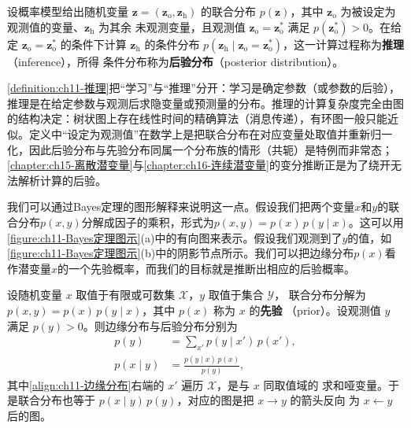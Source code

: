 \documentclass[../../main.tex]{subfiles}
\begin{document}
\begin{definition}[推理]\label{definition:ch11-推理}
设概率模型给出随机变量 $\mathbf{z}=(\mathbf{z}_{\mathrm{o}},
\mathbf{z}_{\mathrm{h}})$ 的联合分布 $p(\mathbf{z})$，其中
$\mathbf{z}_{\mathrm{o}}$ 为被设定为观测值的变量、$\mathbf{z}_{\mathrm{h}}$ 为其余
未观测变量，且观测值 $\mathbf{z}_{\mathrm{o}}=\mathbf{z}_{\mathrm{o}}^{\ast}$ 满足
$p(\mathbf{z}_{\mathrm{o}}^{\ast})>0$。在给定
$\mathbf{z}_{\mathrm{o}}=\mathbf{z}_{\mathrm{o}}^{\ast}$ 的条件下计算
$\mathbf{z}_{\mathrm{h}}$ 的条件分布
$p(\mathbf{z}_{\mathrm{h}}\mid \mathbf{z}_{\mathrm{o}}
=\mathbf{z}_{\mathrm{o}}^{\ast})$，这一计算过程称为\textbf{推理}（inference），所得
条件分布称为\textbf{后验分布}（posterior distribution）。
\end{definition}

\begin{remark}
\cref{definition:ch11-推理}把“学习”与“推理”分开：学习是确定参数（或参数的后验），推理是在给定参数与观测后求隐变量或预测量的分布。推理的计算复杂度完全由图的结构决定：树状图上存在线性时间的精确算法（消息传递），有环图一般只能近似。定义中“设定为观测值”在数学上是把联合分布在对应变量处取值并重新归一化，因此后验分布与先验分布同属一个分布族的情形（共轭）是特例而非常态；\cref{chapter:ch15-离散潜变量}与\cref{chapter:ch16-连续潜变量}的变分推断正是为了绕开无法解析计算的后验。
\end{remark}

我们可以通过Bayes定理的图形解释来说明这一点。假设我们把两个变量$x$和$y$的联合分布$p(x,y)$分解成因子的乘积，形式为$p(x,y)=p(x)\,p(y\mid x)$。这可以用\cref{figure:ch11-Bayes定理图示}(a)中的有向图来表示。假设我们观测到了$y$的值，如\cref{figure:ch11-Bayes定理图示}(b)中的阴影节点所示。我们可以把边缘分布$p(x)$看作潜变量$x$的一个先验概率，而我们的目标就是推断出相应的后验概率。

\begin{proposition}\label{proposition:ch11-Bayes更新}
设随机变量 $x$ 取值于有限或可数集 $\mathcal{X}$，$y$ 取值于集合 $\mathcal{Y}$，
联合分布分解为 $p(x,y)=p(x)\,p(y\mid x)$，其中 $p(x)$ 称为 $x$ 的\textbf{先验}
（prior）。设观测值 $y$ 满足 $p(y)>0$。则边缘分布与后验分布分别为
\begin{align}
  p(y) &= \sum_{x'}p(y\mid x')\,p(x'),
  \label{align:ch11-边缘分布}\\
  p(x\mid y) &= \frac{p(y\mid x)\,p(x)}{p(y)},
  \label{align:ch11-Bayes后验}
\end{align}
其中\eqref{align:ch11-边缘分布}右端的 $x'$ 遍历 $\mathcal{X}$，是与 $x$ 同取值域的
求和哑变量。于是联合分布也等于 $p(x\mid y)\,p(y)$，对应的图是把 $x\to y$ 的箭头反向
为 $x\leftarrow y$ 后的图。
\end{proposition}
\end{document}
